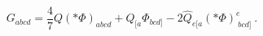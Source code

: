 \begin{equation}
  \label{eq:Grep}
  G_{abcd}= \frac{4}{7}Q (*\Phi)_{abcd}+  Q_{[a}
\Phi_{bcd]}- 2 
\hat Q_{e[a} (*\Phi)^e_{\ bcd]}\ .
\end{equation}

